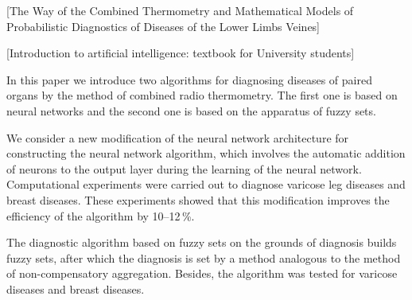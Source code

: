 \begin{thebibliography}{99}
[The Way of the Combined Thermometry and Mathematical Models of Probabilistic Diagnostics of Diseases of the Lower Limbs Veines] \mkpaperr













	[Introduction to artificial intelligence:
	textbook for University students] 
	\mkbookr
	
	
	
	


\end{thebibliography}

\begin{summary}  In this paper we introduce two algorithms for diagnosing diseases of paired organs by the method of combined radio thermometry. The first one is based on neural networks and the second one is based on the apparatus of fuzzy sets.

 We consider a new modification of the neural network architecture for constructing the neural network algorithm, which involves the automatic addition of neurons to the output layer during the learning of the neural network. Compu\-ta\-ti\-o\-nal experiments were carried out to diagnose varicose leg diseases and breast diseases. These experiments showed that this modification improves the efficiency of the algorithm by 10--12\,\%.

 The diagnostic algorithm based on fuzzy sets on the grounds of diagnosis builds fuzzy sets, after which the diagnosis is set by a method analogous to the method of non-compensatory aggregation. Besides, the algorithm was tested for varicose diseases and breast diseases.


\end{summary}



%
